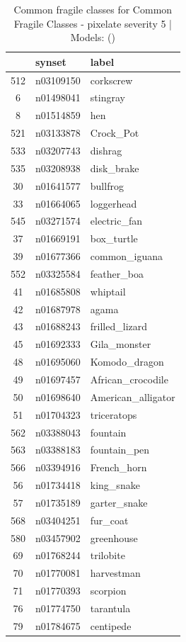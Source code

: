 \begin{table}
\caption{Common fragile classes for Common Fragile Classes - pixelate severity 5 | Models: ()}
\label{tab:Common Fragile Classes - pixelate severity 5_d41d8cd9}
\begin{tabular}{cll}
\toprule
 & synset & label \\
\midrule
512 & n03109150 & corkscrew \\
6 & n01498041 & stingray \\
8 & n01514859 & hen \\
521 & n03133878 & Crock_Pot \\
533 & n03207743 & dishrag \\
535 & n03208938 & disk_brake \\
30 & n01641577 & bullfrog \\
33 & n01664065 & loggerhead \\
545 & n03271574 & electric_fan \\
37 & n01669191 & box_turtle \\
39 & n01677366 & common_iguana \\
552 & n03325584 & feather_boa \\
41 & n01685808 & whiptail \\
42 & n01687978 & agama \\
43 & n01688243 & frilled_lizard \\
45 & n01692333 & Gila_monster \\
48 & n01695060 & Komodo_dragon \\
49 & n01697457 & African_crocodile \\
50 & n01698640 & American_alligator \\
51 & n01704323 & triceratops \\
562 & n03388043 & fountain \\
563 & n03388183 & fountain_pen \\
566 & n03394916 & French_horn \\
56 & n01734418 & king_snake \\
57 & n01735189 & garter_snake \\
568 & n03404251 & fur_coat \\
580 & n03457902 & greenhouse \\
69 & n01768244 & trilobite \\
70 & n01770081 & harvestman \\
71 & n01770393 & scorpion \\
76 & n01774750 & tarantula \\
79 & n01784675 & centipede \\

\end{tabular}
\end{table}
